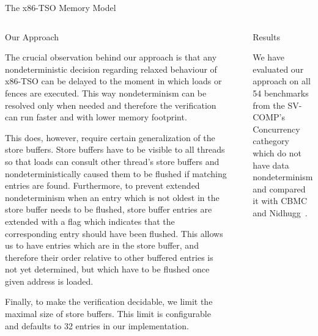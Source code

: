 \documentclass[final, 20pt, a0]{beamer}
\newlength{\sepwid}
\newlength{\onecolwid}
\newlength{\twocolwid}
\newcommand{\xtso}{x86-TSO\xspace}
\begin{document}
\begin{frame}[t]
\begin{columns}[t]
\begin{column}{\twocolwid}
\begin{block}{The \xtso Memory Model}
\end{block}

\begin{columns}[t,totalwidth=\twocolwid] %

\begin{column}{\onecolwid}

\begin{block}{Our Approach}

The crucial observation behind our approach is that any nondeterministic
decision regarding relaxed behaviour of \xtso can be delayed to the moment in
which loads or fences are executed. This way nondeterminism can be resolved
only when needed and therefore the verification can run faster and with lower
memory footprint.

This does, however, require certain generalization of the store buffers. Store
buffers have to be visible to all threads so that loads can consult other
thread's store buffers and nondeterministically caused them to be flushed if
matching entries are found. Furthermore, to prevent extended nondeterminism when
an entry which is not oldest in the store buffer needs to be flushed, store
buffer entries are extended with a flag which indicates that the corresponding
entry should have been flushed. This allows us to have entries which are in the
store buffer, and therefore their order relative to other buffered entries is
not yet determined, but which have to be flushed once given address is loaded.

Finally, to make the verification decidable, we limit the maximal size of store
buffers. This limit is configurable and defaults to 32 entries in our
implementation.

\end{block}


\end{column} %

\begin{column}{\sepwid}\end{column} %
\begin{column}{\onecolwid}

\begin{block}{Results}

We have evaluated our approach on all 54 benchmarks from the SV-COMP's
Concurrency cathegory which do not have data nondeterminism and compared it with
CBMC~\cite{TODO} and Nidhugg~\cite{TODO}.

\end{block}


\end{column}
\end{columns}
\end{column}
\end{columns}
\end{frame}
\end{document}
